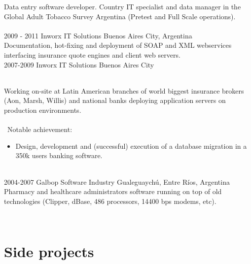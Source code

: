 \documentclass[]{cv-style}          %
\begin{document}
\begin{entrylist}
{  Data entry software developer. Country IT specialist and data manager 
  in the Global Adult Tobacco Survey Argentina (Pretest and Full 
  Scale operations). \\\
}\\
\entry
  {2009 - 2011}
  {Inworx IT Solutions}
  {Buenos Aires City, Argentina}
  {\\
  Documentation, hot-fixing and deployment of SOAP and XML webservices interfacing 
  insurance quote engines and client web servers.
  }\\
\entry
  {2007-2009}
  {Inworx IT Solutions}
  {Buenos Aires City}
  {\\
  Working on-site at Latin American branches of world biggest insurance brokers 
  (Aon, Marsh, Willis) and national banks deploying application servers on 
  production environments.\\\
  \\\
  Notable achievement:
  \begin{itemize}
    \item Design, development and (successful) execution of a database migration 
    in a 350k users banking software.
  \end{itemize}
}\\
\entry
  {2004-2007}
  {Galbop Software Industry}
  {Gualeguaychú, Entre Ríos, Argentina}
  {\\
  Pharmacy and healthcare administrators software running on top of old technologies 
  (Clipper, dBase, 486 processors, 14400 bps modems, etc).\\
}
\end{entrylist}
\\

\section{Side projects}
\end{document}
